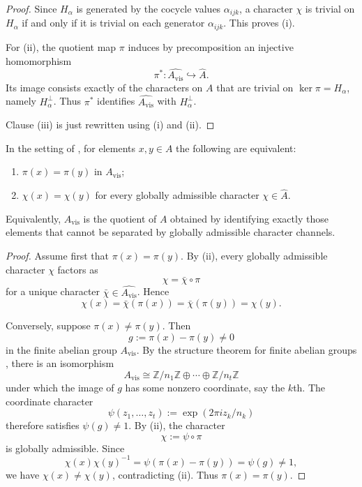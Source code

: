 \begin{proof}
Since $H_\alpha$ is generated by the cocycle values $\alpha_{ijk}$, a character $\chi$ is trivial on $H_\alpha$ if and only if it is trivial on each generator $\alpha_{ijk}$. This proves (i).

For (ii), the quotient map $\pi$ induces by precomposition an injective homomorphism
\[
\pi^*:\widehat{A_{\mathrm{vis}}}\hookrightarrow \widehat A.
\]
Its image consists exactly of the characters on $A$ that are trivial on $\ker\pi=H_\alpha$, namely $H_\alpha^\perp$. Thus $\pi^*$ identifies $\widehat{A_{\mathrm{vis}}}$ with $H_\alpha^\perp$.

Clause \textup{(iii)} is just  rewritten using \textup{(i)} and \textup{(ii)}.
\end{proof}

\begin{corollary}\label{cor:visible-quotient-character-separation}
In the setting of , for elements $x,y\in A$ the following are equivalent:
\begin{enumerate}[label=(\roman*),nosep]
\item $\pi(x)=\pi(y)$ in $A_{\mathrm{vis}}$;
\item $\chi(x)=\chi(y)$ for every globally admissible character $\chi\in\widehat A$.
\end{enumerate}
Equivalently, $A_{\mathrm{vis}}$ is the quotient of $A$ obtained by identifying exactly those elements that cannot be separated by globally admissible character channels.
\end{corollary}

\begin{proof}
Assume first that $\pi(x)=\pi(y)$. By (ii), every globally admissible character $\chi$ factors as
\[
\chi=\bar\chi\circ\pi
\]
for a unique character $\bar\chi\in\widehat{A_{\mathrm{vis}}}$. Hence
\[
\chi(x)=\bar\chi(\pi(x))=\bar\chi(\pi(y))=\chi(y).
\]

Conversely, suppose $\pi(x)\neq\pi(y)$. Then
\[
g:=\pi(x)-\pi(y)\neq 0
\]
in the finite abelian group $A_{\mathrm{vis}}$. By the structure theorem for finite abelian groups \cite{DummitFoote2004}, there is an isomorphism
\[
A_{\mathrm{vis}}\cong \mathbb Z/n_1\mathbb Z\oplus\cdots\oplus \mathbb Z/n_t\mathbb Z
\]
under which the image of $g$ has some nonzero coordinate, say the $k$th. The coordinate character
\[
\psi(z_1,\dots,z_t):=\exp(2\pi i z_k/n_k)
\]
therefore satisfies $\psi(g)\neq 1$. By (ii), the character
\[
\chi:=\psi\circ\pi
\]
is globally admissible. Since
\[
\chi(x)\chi(y)^{-1}=\psi(\pi(x)-\pi(y))=\psi(g)\neq 1,
\]
we have $\chi(x)\neq\chi(y)$, contradicting (ii). Thus $\pi(x)=\pi(y)$.
\end{proof}

